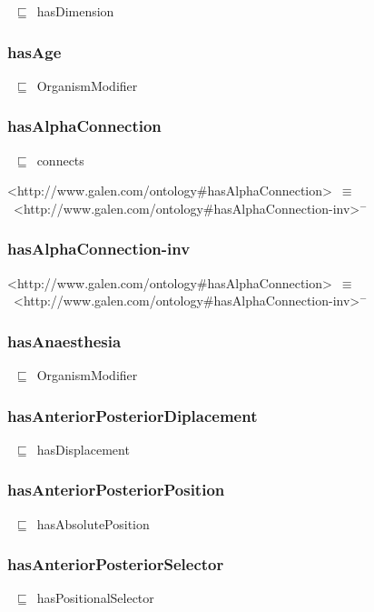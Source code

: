 \documentclass{article}
\begin{document}
~\ensuremath{\sqsubseteq}~hasDimension

\subsubsection*{hasAge}

~\ensuremath{\sqsubseteq}~OrganismModifier

\subsubsection*{hasAlphaConnection}

~\ensuremath{\sqsubseteq}~connects

<http://www.galen.com/ontology#hasAlphaConnection>~\ensuremath{\equiv}~<http://www.galen.com/ontology#hasAlphaConnection-inv>\ensuremath{^-}

\subsubsection*{hasAlphaConnection-inv}

<http://www.galen.com/ontology#hasAlphaConnection>~\ensuremath{\equiv}~<http://www.galen.com/ontology#hasAlphaConnection-inv>\ensuremath{^-}

\subsubsection*{hasAnaesthesia}

~\ensuremath{\sqsubseteq}~OrganismModifier

\subsubsection*{hasAnteriorPosteriorDiplacement}

~\ensuremath{\sqsubseteq}~hasDisplacement

\subsubsection*{hasAnteriorPosteriorPosition}

~\ensuremath{\sqsubseteq}~hasAbsolutePosition

\subsubsection*{hasAnteriorPosteriorSelector}

~\ensuremath{\sqsubseteq}~hasPositionalSelector
\end{document}
